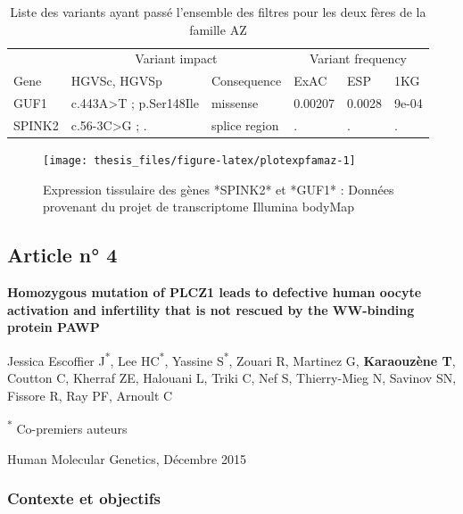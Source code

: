 \documentclass[12pt,twoside]{reedthesis}
\theoremstyle{definition}
\theoremstyle{definition}
\theoremstyle{remark}
\begin{document}
  \begin{longtable}[t]{llllll}
  \caption{\label{tab:tabrecapaz}Liste des variants ayant passé l'ensemble des filtres pour les deux fères de la famille AZ}\\
  \toprule
  \multicolumn{1}{c}{ } & \multicolumn{2}{c}{Variant impact} & \multicolumn{3}{c}{Variant frequency} \\
  \cmidrule(l{2pt}r{2pt}){2-3} \cmidrule(l{2pt}r{2pt}){4-6}
  Gene & HGVSc, HGVSp & Consequence & ExAC & ESP & 1KG\\
  \midrule
  GUF1 & c.443A>T ; p.Ser148Ile & missense & 0.00207 & 0.0028 & 9e-04\\
  SPINK2 & c.56-3C>G ; . & splice region & . & . & .\\
  \bottomrule
  \end{longtable}
  
  \newpage
  
  \begin{figure}
  
  {\centering \texttt{[image: thesis\_files/figure-latex/plotexpfamaz-1]} 
  
  }
  
  \caption[Expression tissulaire des gènes *SPINK2* et *GUF1*]{Expression tissulaire des gènes *SPINK2* et *GUF1* : Données provenant du projet de transcriptome Illumina bodyMap}\label{fig:plotexpfamaz}
  \end{figure}
  
  \newpage
  
  \subsection{Article n° 4}\label{article-n-4}
  
  \textbf{Homozygous mutation of PLCZ1 leads to defective human oocyte
  activation and infertility that is not rescued by the WW-binding protein
  PAWP}
  
  Jessica Escoffier J\textsuperscript{*}, Lee HC\textsuperscript{*},
  Yassine S\textsuperscript{*}, Zouari R, Martinez G, \textbf{Karaouzène
  T}, Coutton C, Kherraf ZE, Halouani L, Triki C, Nef S, Thierry-Mieg N,
  Savinov SN, Fissore R, Ray PF, Arnoult C
  
  \textsuperscript{*} Co-premiers auteurs
  
  Human Molecular Genetics, Décembre 2015
  
  \newpage
  
  \subsubsection{Contexte et objectifs}\label{contexte-et-objectifs-1}
  
\end{document}
